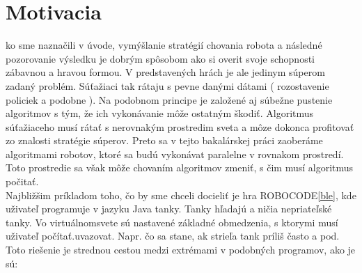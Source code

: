 \section{Motivacia}
ko sme naznačili v úvode, vymýšlanie stratégií chovania robota a následné pozorovanie výsledku je dobrým spôsobom ako si overit svoje schopnosti zábavnou a hravou formou. V predstavených hrách je ale jedinym súperom zadaný problém. Súťažiaci tak rátaju s pevne danými dátami ( rozostavenie policiek a podobne ). Na podobnom principe je založené aj súbežne pustenie algoritmov s tým, že ich vykonávanie môže ostatným škodiť. Algoritmus súťažiaceho musí rátať s nerovnakým prostredim sveta a môze dokonca profitovať zo znalosti stratégie súperov. Preto sa v tejto bakalárskej práci zaoberáme algoritmami robotov, ktoré sa budú vykonávat paralelne v rovnakom prostredí. Toto prostredie sa však môže chovaním algoritmov zmeniť, s čim musí algoritmus počitať.\\
Najbližšim príkladom toho, čo by sme chceli docieliť je hra ROBOCODE\ref{ble}, kde uživateľ programuje v jazyku Java tanky. Tanky hľadajú a ničia nepriateľské tanky.  Vo virtuálnomsvete sú nastavené základné obmedzenia, s ktorymi musí uživateľ počítať.uvazovat.  Napr. čo sa stane, ak strieľa tank príliš často a pod. Toto riešenie je strednou cestou medzi extrémami v podobných programov, ako je sú:
